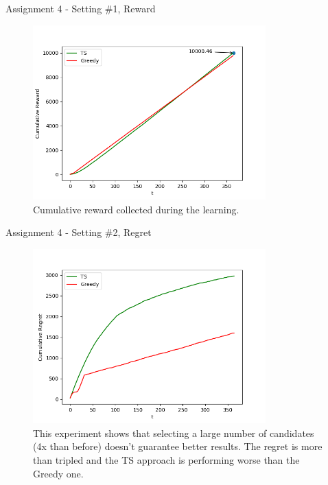 \documentclass[11pt]{beamer}
\begin{document}
\begin{frame}{Assignment 4 - Setting \#1, Reward}
\begin{figure}[hbtp]
\centering
\includegraphics[width=0.8\textwidth]{images/assignment_4_exp_1_cum_reward.png}
\caption{Cumulative reward collected during the learning.}
\end{figure}
\end{frame}

\begin{frame}{Assignment 4 - Setting \#2, Regret}
\begin{figure}[hbtp]
\centering
\includegraphics[width=0.8\textwidth]{images/assignment_4_exp_2_cum_regret.png}
\caption{This experiment shows that selecting a large number of candidates (4x than before) doesn't guarantee better results. The regret is more than tripled and the TS approach is performing worse than the Greedy one.}
\end{figure}
\end{frame}
\end{document}
